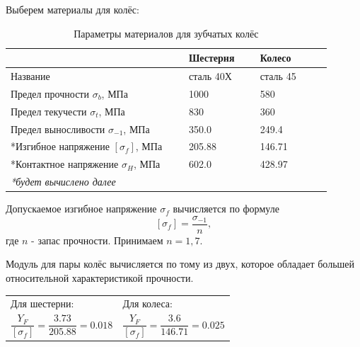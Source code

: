 \documentclass[14pt,a4paper,russian]{scrartcl}
\begin{document}
        Выберем материалы для колёс:
        \begin{table}[h!]
            \begin{center}
                \begin{tabular}{p{0.5\linewidth}p{0.2\linewidth}p{0.2\linewidth}}
                    \hline
                        & Шестерня  &   Колесо\\
                    \hline
                    Название    & сталь 40Х &   сталь 45 \\
                    Предел прочности \( \sigma_b \), МПа  & 1000 & 580 \\
                    Предел текучести \( \sigma_t \), МПа  &   830 & 360 \\
                    Предел выносливости \( \sigma_{-1} \), МПа  & 350.0 & 249.4 \\
                    *Изгибное напряжение \( [\sigma_f] \), МПа & 205.88 & 146.71 \\
                    *Контактное напряжение \( \sigma_H \), МПа & 602.0 & 428.97 \\
                    \hline
                    \emph{*будет вычислено далее}
                \end{tabular}
                \caption{Параметры материалов для зубчатых колёс}\label{tab:gear_materials}
            \end{center}
        \end{table}

        Допускаемое изгибное напряжение \( \sigma_f \) вычисляется по формуле 
        \[ [\sigma_f] = \frac{\sigma_{-1}}{n}, \]
        где \( n \) - запас прочности. Принимаем \( n=1,7 \).\par
        
        Модуль для пары колёс вычисляется по тому из двух, которое обладает
        большей относительной характеристикой прочности.

       \begin{table}[h!]
            \begin{center}
                \begin{tabular}{p{0.5\linewidth}p{0.5\linewidth}}
                    Для шестерни:  &   Для колеса:\\
                    \[ \frac{Y_F}{[\sigma_f]} = 
                        \frac{3.73}{205.88} = 0.018\] &
                    \[ \frac{Y_F}{[\sigma_f]} = 
                    \frac{3.6}{146.71} = 0.025 \]\\                    
                \end{tabular}
            \end{center}
        \end{table}
\end{document}
